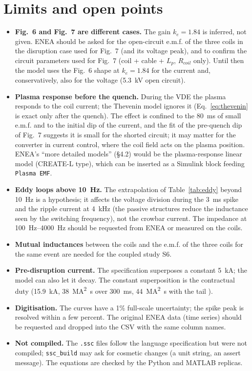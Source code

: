 \documentclass[11pt,a4paper]{article}
\newcommand{\code}[1]{\texttt{#1}}
\begin{document}
\section{Limits and open points}
\label{sec:limits}
\begin{itemize}[leftmargin=*]
\item \textbf{Fig.~6 and Fig.~7 are different cases.} The gain $k_e = 1.84$ is inferred, not given. ENEA should be asked for the open-circuit e.m.f. of the three coils in the disruption case used for Fig.~7 (and its voltage peak), and to confirm the circuit parameters used for Fig.~7 (coil + cable + $L_p$, $R_{coil}$ only). Until then the model uses the Fig.~6 shape at $k_e = 1.84$ for the current and, conservatively, also for the voltage (\SI{5.3}{\kilo\volt} open circuit).
\item \textbf{Plasma response before the quench.} During the VDE the plasma responds to the coil current; the Thevenin model ignores it (Eq.~\eqref{eq:thevenin} is exact only after the quench). The effect is confined to the \SI{80}{\milli\second} of small e.m.f. and to the initial dip of the current, and the fit of the pre-quench dip of Fig.~7 suggests it is small for the shorted circuit; it may matter for the converter in current control, where the coil field acts on the plasma position. ENEA's ``more detailed models'' (\S4.2) would be the plasma-response linear model (CREATE-L type), which can be inserted as a Simulink block feeding \code{Plasma EMF}.
\item \textbf{Eddy loops above \SI{10}{\hertz}.} The extrapolation of Table~\ref{tab:eddy} beyond \SI{10}{\hertz} is a hypothesis; it affects the voltage division during the \SI{3}{\milli\second} spike and the ripple current at \SI{4}{\kilo\hertz} (the passive structures reduce the inductance seen by the switching frequency), not the crowbar current. The impedance at \SIrange{100}{4000}{\hertz} should be requested from ENEA or measured on the coils.
\item \textbf{Mutual inductances} between the coils and the e.m.f. of the three coils for the same event are needed for the coupled study S6.
\item \textbf{Pre-disruption current.} The specification superposes a constant \SI{5}{\kilo\ampere}; the model can also let it decay. The constant superposition is the contractual duty (\SI{15.9}{\kilo\ampere}, \SI{38}{\mega\ampere\squared\second} over \SI{300}{\milli\second}, \SI{44}{\mega\ampere\squared\second} with the tail \cite{crowbar_note}).
\item \textbf{Digitisation.} The curves have a 1\% full-scale uncertainty; the spike peak is resolved within a few percent. The original ENEA data (time series) should be requested and dropped into the CSV with the same column names.
\item \textbf{Not compiled.} The \code{.ssc} files follow the language specification but were not compiled; \code{ssc\_build} may ask for cosmetic changes (a unit string, an assert message). The equations are checked by the Python and MATLAB replicas.
\end{itemize}
\end{document}
